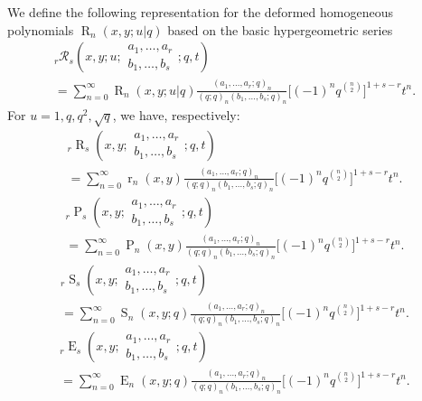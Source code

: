 \documentclass{cimart}
\newcommand{\rbhs}{\mathcal{R}}
\DeclareMathOperator{\opE}{E}
\DeclareMathOperator{\opP}{P}
\DeclareMathOperator{\opR}{R}
\DeclareMathOperator{\opr}{r}
\DeclareMathOperator{\opS}{S}
\begin{document}
\begin{definition}
We define the following representation for the deformed homogeneous polynomials $\opR_{n}(x,y;u|q)$ based on the basic hypergeometric series
    \begin{multline}
        {}_{r}\rbhs_{s}\left(x,y;u;
        \begin{array}{c}
             a_{1},\ldots,a_{r} \\
             b_{1},\ldots,b_{s}
        \end{array};
        q,t
        \right)\\
        =\sum_{n=0}^{\infty}\opR_{n}(x,y;u|q)\frac{(a_{1},\ldots,a_{r};q)_{n}}{(q;q)_{n}(b_{1},\ldots,b_{s};q)_{n}}\Big[(-1)^{n}q^{\binom{n}{2}}\Big]^{1+s-r}t^n.
    \end{multline}
For $u=1,q,q^2,\sqrt{q}$, we have, respectively:
\begin{multline}
        {}_{r}\opR_{s}\left(x,y;
        \begin{array}{c}
             a_{1},\ldots,a_{r} \\
             b_{1},\ldots,b_{s}
        \end{array};
        q,t
        \right)\\
        =\sum_{n=0}^{\infty}\opr_{n}(x,y)\frac{(a_{1},\ldots,a_{r};q)_{n}}{(q;q)_{n}(b_{1},\ldots,b_{s};q)_{n}}\Big[(-1)^{n}q^{\binom{n}{2}}\Big]^{1+s-r}t^n.
    \end{multline}
    \begin{multline}
        {}_{r}\opP_{s}\left(x,y;
        \begin{array}{c}
             a_{1},\ldots,a_{r} \\
             b_{1},\ldots,b_{s}
        \end{array};
        q,t
        \right)\\
        =\sum_{n=0}^{\infty}\opP_{n}(x,y)\frac{(a_{1},\ldots,a_{r};q)_{n}}{(q;q)_{n}(b_{1},\ldots,b_{s};q)_{n}}\Big[(-1)^{n}q^{\binom{n}{2}}\Big]^{1+s-r}t^n.
    \end{multline}
    \begin{multline}
        {}_{r}\opS_{s}\left(x,y;
        \begin{array}{c}
             a_{1},\ldots,a_{r} \\
             b_{1},\ldots,b_{s}
        \end{array};
        q,t
        \right)\\
        =\sum_{n=0}^{\infty}\opS_{n}(x,y;q)\frac{(a_{1},\ldots,a_{r};q)_{n}}{(q;q)_{n}(b_{1},\ldots,b_{s};q)_{n}}\Big[(-1)^{n}q^{\binom{n}{2}}\Big]^{1+s-r}t^n.
    \end{multline}
    \begin{multline}
        {}_{r}\opE_{s}\left(x,y;
        \begin{array}{c}
             a_{1},\ldots,a_{r} \\
             b_{1},\ldots,b_{s}
        \end{array};
        q,t
        \right)\\
        =\sum_{n=0}^{\infty}\opE_{n}(x,y;q)\frac{(a_{1},\ldots,a_{r};q)_{n}}{(q;q)_{n}(b_{1},\ldots,b_{s};q)_{n}}\Big[(-1)^{n}q^{\binom{n}{2}}\Big]^{1+s-r}t^n.
    \end{multline}
\end{definition}
\end{document}
